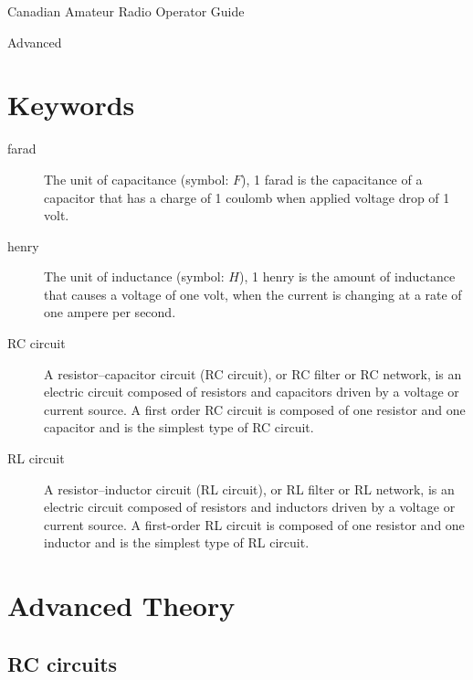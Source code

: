 \documentclass[letterpaper]{article}
\begin{document}
    \begin{center}
        \Large
        Canadian Amateur Radio Operator Guide

        Advanced
    \end{center}

    \tableofcontents
    \newpage


    \section*{Keywords}
        \begin{description}
            \item[farad] The unit of capacitance (symbol: $ F $), 1 farad is the capacitance of a capacitor that has a charge of 1 coulomb when applied voltage drop of 1 volt.
            \item[henry] The unit of inductance (symbol: $ H $), 1 henry is the amount of inductance that causes a voltage of one volt, when the current is changing at a rate of one ampere per second.
            \item[RC circuit] A resistor–capacitor circuit (RC circuit), or RC filter or RC network, is an electric circuit composed of resistors and capacitors driven by a voltage or current source. A first order RC circuit is composed of one resistor and one capacitor and is the simplest type of RC circuit.
            \item[RL circuit] A resistor–inductor circuit (RL circuit), or RL filter or RL network, is an electric circuit composed of resistors and inductors driven by a voltage or current source. A first-order RL circuit is composed of one resistor and one inductor and is the simplest type of RL circuit.
        \end{description}

    \section{Advanced Theory}
        \subsection{RC circuits}
\end{document}
